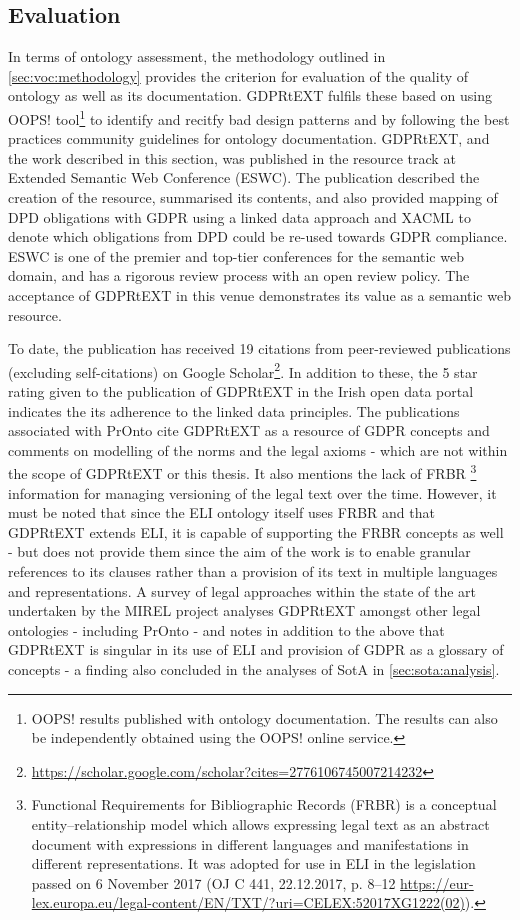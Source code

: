 \subsection{Evaluation}\label{sec:voc:gdprtext:evaluation}
In terms of ontology assessment, the methodology outlined in \autoref{sec:voc:methodology} provides the criterion for evaluation of the quality of ontology as well as its documentation. GDPRtEXT fulfils these based on using OOPS! tool\footnote{OOPS! results published with ontology documentation. The results can also be independently obtained using the OOPS! online service.} to identify and recitfy bad design patterns and by following the best practices community guidelines for ontology documentation.
GDPRtEXT, and the work described in this section, was published in the resource track at Extended Semantic Web Conference \cite{pandit_gdprtext_2018} (ESWC). The publication described the creation of the resource, summarised its contents, and also provided mapping of DPD obligations with GDPR using a linked data approach and XACML to denote which obligations from DPD could be re-used towards GDPR compliance. 
ESWC is one of the premier and top-tier conferences for the semantic web domain, and has a rigorous review process with an open review policy.
The acceptance of GDPRtEXT in this venue demonstrates its value as a semantic web resource.

To date, the publication has received 19 citations from peer-reviewed publications (excluding self-citations) on Google Scholar\footnote{\url{https://scholar.google.com/scholar?cites=2776106745007214232}}.
In addition to these, the 5 star rating given to the publication of GDPRtEXT in the Irish open data portal indicates the its adherence to the linked data principles.
The publications associated with PrOnto \cite{palmirani_pronto_2018,palmirani_pronto_2018-1} cite GDPRtEXT as a resource of GDPR concepts and comments on modelling of the norms and the legal axioms - which are not within the scope of GDPRtEXT or this thesis. It also mentions the lack of FRBR
\footnote{Functional Requirements for Bibliographic Records (FRBR) is a conceptual entity–relationship model which allows expressing legal text as an abstract document with expressions in different languages and manifestations in different representations. It was adopted for use in ELI in the legislation passed on 6 November 2017 (OJ C 441, 22.12.2017, p. 8–12 \url{https://eur-lex.europa.eu/legal-content/EN/TXT/?uri=CELEX:52017XG1222(02)}).}
information for managing versioning of the legal text over the time.
However, it must be noted that since the ELI ontology itself uses FRBR and that GDPRtEXT extends ELI, it is capable of supporting the FRBR concepts as well - but does not provide them since the aim of the work is to enable granular references to its clauses rather than a provision of its text in multiple languages and representations. 
A survey of legal approaches within the state of the art \cite{leone_taking_2019} undertaken by the MIREL project analyses GDPRtEXT amongst other legal ontologies - including PrOnto - and notes in addition to the above that GDPRtEXT is singular in its use of ELI and provision of GDPR as a glossary of concepts - a finding also concluded in the analyses of SotA in \autoref{sec:sota:analysis}.

